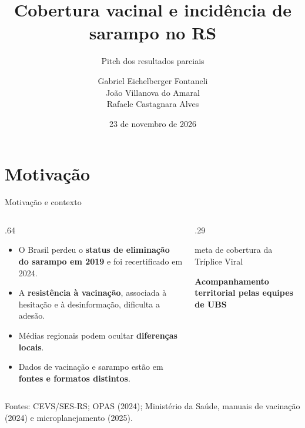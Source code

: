 \documentclass[aspectratio=169]{beamer}
\title[Cobertura vacinal e sarampo]{Cobertura vacinal e incidência de sarampo no RS}
\subtitle{Pitch dos resultados parciais}
\date{23 de novembro de 2026}
\author{\scriptsize Gabriel Eichelberger Fontaneli\\João Villanova do Amaral\\Rafaele Castagnara Alves}
\institute{Instituto de Informática --- UFRGS\\PET-Saúde Digital}
\newcommand{\fonte}[1]{\vfill{\tiny\color{InfGray}#1\par}}
\newcommand{\destaque}[1]{{\color{InfRed}\bfseries #1}}
\begin{document}
\InfTitlePage

\section{Motivação}
\begin{frame}[t]{Motivação e contexto}
\vspace{3mm}
\begin{columns}[T,onlytextwidth]
\begin{column}{.64\textwidth}
\begin{itemize}\setlength{\itemsep}{2mm}
 \item O Brasil perdeu o \textbf{status de eliminação do sarampo em 2019} e foi recertificado em 2024.
 \item A \textbf{resistência à vacinação}, associada à hesitação e à desinformação, dificulta a adesão.
 \item Médias regionais podem ocultar \textbf{diferenças locais}.
 \item Dados de vacinação e sarampo estão em \textbf{fontes e formatos distintos}.
\end{itemize}
\end{column}
\begin{column}{.29\textwidth}
\centering\vspace{2mm}
{\fontsize{36}{40}\selectfont\destaque{95\%}}\par
\vspace{2mm}meta de cobertura da Tríplice Viral\par
\vspace{6mm}\textbf{Acompanhamento territorial pelas equipes de UBS}
\end{column}
\end{columns}
\fonte{Fontes: CEVS/SES-RS; OPAS (2024); Ministério da Saúde, manuais de vacinação (2024) e microplanejamento (2025).}
\end{frame}
\end{document}
